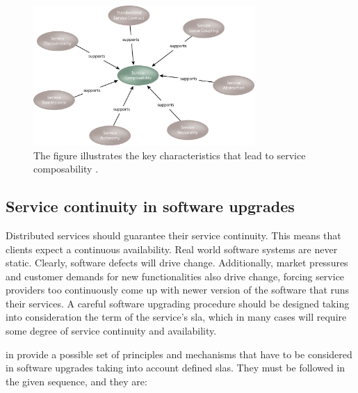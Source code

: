 \begin{figure}
	\centering{}
	\includegraphics[width=0.75\textwidth]{chapters/elasticity/images/composability.png}
	\caption[Characterstics for service composability]{The figure illustrates the key characteristics that
		lead to service composability \cite{serviceComposability}.}
	\label{img:elasticity-requirements-composability}
\end{figure}

\subsection{Service continuity in software upgrades}
\label{sec:elasticity-requirements-serviceContinutiy}
Distributed services should guarantee their service continuity. This means that clients expect a
continuous availability. Real world software systems are never static. Clearly, software defects will
drive change. Additionally, market pressures and customer demands for new functionalities also drive
change, forcing service providers too continuously come up with newer version of the software that
runs their services. A careful software upgrading procedure should be designed taking into consideration
the term of the service's \ac{sla}, which in many cases will require some degree of service continuity
and availability.

\citeauthor{li2011evaluating} in \cite{li2011evaluating} provide a possible set of principles and mechanisms
that have to be considered in software upgrades taking into account defined \ac{sla}s. They must be followed
in the given sequence, and they are:

